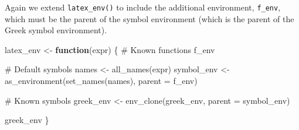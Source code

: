 \documentclass[
]{krantz}
\makeatletter
\newenvironment{Shaded}{\begin{snugshade}}{\end{snugshade}}
\newcommand{\CharTok}[1]{\textcolor[rgb]{0.31,0.60,0.02}{#1}}
\newcommand{\CommentTok}[1]{\textcolor[rgb]{0.56,0.35,0.01}{\textit{#1}}}
\newcommand{\ControlFlowTok}[1]{\textcolor[rgb]{0.13,0.29,0.53}{\textbf{#1}}}
\newcommand{\DataTypeTok}[1]{\textcolor[rgb]{0.13,0.29,0.53}{#1}}
\newcommand{\KeywordTok}[1]{\textcolor[rgb]{0.13,0.29,0.53}{\textbf{#1}}}
\newcommand{\NormalTok}[1]{#1}
\newcommand{\StringTok}[1]{\textcolor[rgb]{0.31,0.60,0.02}{#1}}
\newenvironment{kframe}{%
\medskip{}
\setlength{\fboxsep}{.8em}
 \def\at@end@of@kframe{}%
 \ifinner\ifhmode%
  \def\at@end@of@kframe{\end{minipage}}%
  \begin{minipage}{\columnwidth}%
 \fi\fi%
 \def\FrameCommand##1{\hskip\@totalleftmargin \hskip-\fboxsep
 \colorbox{shadecolor}{##1}\hskip-\fboxsep
     \hskip-\linewidth \hskip-\@totalleftmargin \hskip\columnwidth}%
 \MakeFramed {\advance\hsize-\width
   \@totalleftmargin\z@ \linewidth\hsize
   \@setminipage}}%
 {\par\unskip\endMakeFramed%
 \at@end@of@kframe}
\renewenvironment{Shaded}{\begin{kframe}}{\end{kframe}}
\renewcommand{\KeywordTok} [1]{\textcolor[rgb]{0.00,0.44,0.13}{{#1}}}
\renewcommand{\DataTypeTok}[1]{\textcolor[rgb]{0.56,0.13,0.00}{{#1}}}
\renewcommand{\CharTok}    [1]{\textcolor[rgb]{0.25,0.44,0.63}{{#1}}}
\renewcommand{\StringTok}  [1]{\textcolor[rgb]{0.25,0.44,0.63}{{#1}}}
\renewcommand{\CommentTok} [1]{\textcolor[rgb]{0.38,0.63,0.69}{{#1}}}
\renewcommand{\NormalTok}  [1]{{#1}}
\makeatother
\begin{document}
\begin{Shaded}
\end{Shaded}

Again we extend \texttt{latex\_env()} to include the additional environment, \texttt{f\_env}, which must be the parent of the symbol environment (which is the parent of the Greek symbol environment).

\begin{Shaded}
\begin{Highlighting}[]
\NormalTok{latex_env <-}\StringTok{ }\ControlFlowTok{function}\NormalTok{(expr) \{}
  \CommentTok{# Known functions}
\NormalTok{  f_env}
  
  \CommentTok{# Default symbols}
\NormalTok{  names <-}\StringTok{ }\KeywordTok{all_names}\NormalTok{(expr)}
\NormalTok{  symbol_env <-}\StringTok{ }\KeywordTok{as_environment}\NormalTok{(}\KeywordTok{set_names}\NormalTok{(names), }\DataTypeTok{parent =}\NormalTok{ f_env)}
  
  \CommentTok{# Known symbols}
\NormalTok{  greek_env <-}\StringTok{ }\KeywordTok{env_clone}\NormalTok{(greek_env, }\DataTypeTok{parent =}\NormalTok{ symbol_env)}
  
\NormalTok{  greek_env}
\NormalTok{\}}
\end{Highlighting}
\end{Shaded}
\end{document}
